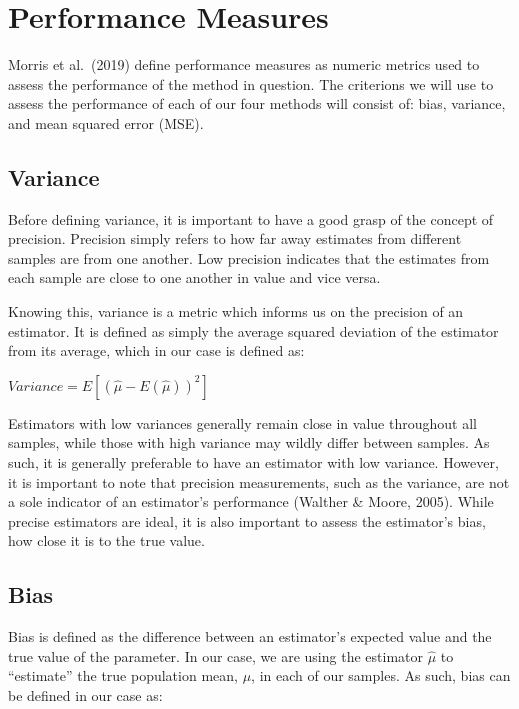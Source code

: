 \documentclass[12pt, twoside]{amherstthesis}
\begin{document}
\hypertarget{performance_measures}{%
\section{Performance Measures}\label{performance_measures}}

Morris et al.~(2019) define performance measures as numeric metrics used to assess the performance of the method in question. The criterions we will use to assess the performance of each of our four methods will consist of: bias, variance, and mean squared error (MSE).

\hypertarget{variance}{%
\subsection{Variance}\label{variance}}

Before defining variance, it is important to have a good grasp of the concept of precision. Precision simply refers to how far away estimates from different samples are from one another. Low precision indicates that the estimates from each sample are close to one another in value and vice versa.

Knowing this, variance is a metric which informs us on the precision of an estimator. It is defined as simply the average squared deviation of the estimator from its average, which in our case is defined as:

\(Variance = E[(\hat{\mu}-E(\hat{\mu}))^2]\)

Estimators with low variances generally remain close in value throughout all samples, while those with high variance may wildly differ between samples. As such, it is generally preferable to have an estimator with low variance. However, it is important to note that precision measurements, such as the variance, are not a sole indicator of an estimator's performance (Walther \& Moore, 2005). While precise estimators are ideal, it is also important to assess the estimator's bias, how close it is to the true value.

\hypertarget{bias}{%
\subsection{Bias}\label{bias}}

Bias is defined as the difference between an estimator's expected value and the true value of the parameter. In our case, we are using the estimator \(\hat{\mu}\) to ``estimate'' the true population mean, \(\mu\), in each of our samples. As such, bias can be defined in our case as:
\end{document}
